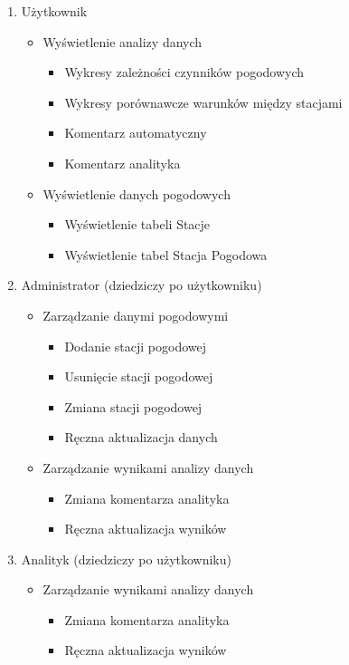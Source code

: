 \documentclass[12pt,a4paper]{article}
\begin{document}
\begin{small}
\begin{enumerate}
\item Użytkownik
    \begin{itemize}
    \item Wyświetlenie analizy danych
        \begin{itemize}
        \item Wykresy zależności czynników pogodowych
        \item Wykresy porównawcze warunków między stacjami
        \item Komentarz automatyczny
        \item Komentarz analityka
        \end{itemize}
    \item Wyświetlenie danych pogodowych
        \begin{itemize}
        \item Wyświetlenie tabeli Stacje
        \item Wyświetlenie tabel Stacja Pogodowa
        \end{itemize}
    \end{itemize}
\item Administrator (dziedziczy po użytkowniku)
    \begin{itemize}
    \item Zarządzanie danymi pogodowymi
        \begin{itemize}
        \item Dodanie stacji pogodowej
        \item Usunięcie stacji pogodowej
        \item Zmiana stacji pogodowej
        \item Ręczna aktualizacja danych
        \end{itemize}
    \item Zarządzanie wynikami analizy danych
        \begin{itemize}
        \item Zmiana komentarza analityka
        \item Ręczna aktualizacja wyników
        \end{itemize}
    \end{itemize}
\item Analityk (dziedziczy po użytkowniku)
    \begin{itemize}
    \item Zarządzanie wynikami analizy danych
        \begin{itemize}
        \item Zmiana komentarza analityka
        \item Ręczna aktualizacja wyników
        \end{itemize}
    \end{itemize}
\end{enumerate}
 
\end{small}
\end{document}
